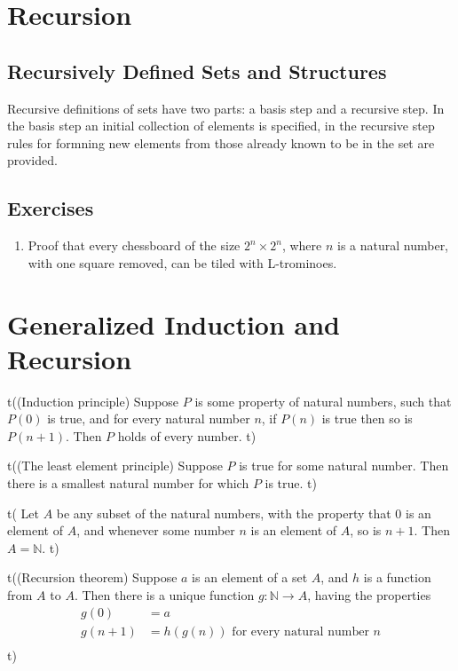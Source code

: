 \documentclass[letterpaper, 10pt]{article}
\theoremstyle{definition}
\begin{document}
\section{Recursion}
\subsection{Recursively Defined Sets and Structures}
	Recursive definitions of sets have two parts: a basis step and a recursive
	step. In the basis step an initial collection of elements is specified, in
	the recursive step rules for formning new elements from those already known
	to be in the set are provided.
\subsection{Exercises}
\begin{enumerate}
	\item Proof that every chessboard of the size $2^n\times 2^n$, where $n$ is a
		natural number, with one square removed, can be tiled with L-trominoes.
\end{enumerate}

\section{Generalized Induction and Recursion}

t((Induction principle)
Suppose $P$ is some property of natural numbers, such that $P(0)$ is true, and
for every natural number $n$, if $P(n)$ is true then so is $P(n+1)$. Then $P$
holds of every number.
t)

t((The least element principle)
Suppose $P$ is true for some natural number. Then there is a smallest natural
number for which $P$ is true.
t)

t(
Let $A$ be any subset of the natural numbers, with the property that $0$ is an
element of $A$, and whenever some number $n$ is an element of $A$, so is $n +
1$. Then $A = \mathbb{N}$.
t)

t((Recursion theorem)
Suppose $a$ is an element of a set $A$, and $h$ is a function from $A$ to $A$.
Then there is a unique function $g \colon \mathbb{N} \to A$, having the
properties
\begin{align*}
	g(0) &= a \\
	g(n + 1) &= h(g(n)) \text{ for every natural number $n$} \\
\end{align*}
t)
\end{document}
